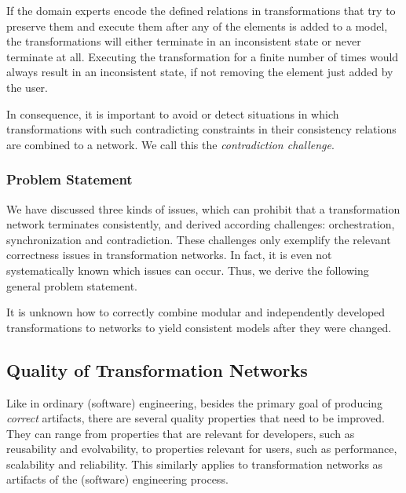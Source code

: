 If the domain experts encode the defined relations in transformations that try to preserve them and execute them after any of the elements is added to a model, the transformations will either terminate in an inconsistent state or never terminate at all.
Executing the transformation for a finite number of times would always result in an inconsistent state, if not removing the element just added by the user.

In consequence, it is important to avoid or detect situations in which transformations with such contradicting constraints in their consistency relations are combined to a network.
We call this the \emph{contradiction challenge}.

\subsubsection*{Problem Statement}

We have discussed three kinds of issues, which can prohibit that a transformation network terminates consistently, and derived according challenges: orchestration, synchronization and contradiction.
These challenges only exemplify the relevant correctness issues in transformation networks. 
In fact, it is even not systematically known which issues can occur.
Thus, we derive the following general problem statement.

\begin{problemstatement}
    It is unknown how to correctly combine modular and independently developed transformations to networks to yield consistent models after they were changed.
\end{problemstatement}

\subsection{Quality of Transformation Networks}

Like in ordinary (software) engineering, besides the primary goal of producing \emph{correct} artifacts, there are several quality properties that need to be improved.
They can range from properties that are relevant for developers, such as reusability and evolvability, to properties relevant for users, such as performance, scalability and reliability.
This similarly applies to transformation networks as artifacts of the (software) engineering process.

